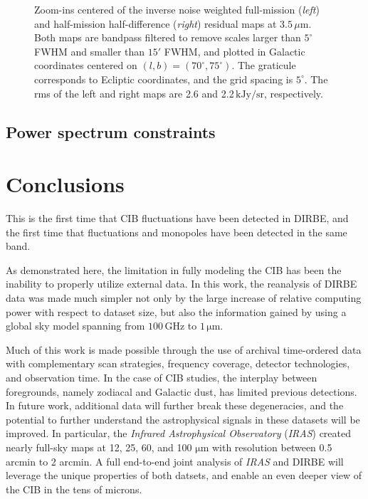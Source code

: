 \documentclass{aa}
\begin{document}
\begin{figure}
  \caption{Zoom-ins centered of the inverse noise weighted full-mission (\emph{left}) and half-mission half-difference (\emph{right}) residual maps at $3.5\,\mu\mathrm{m}$. Both maps are bandpass filtered to remove scales larger than $5^{\circ}$ FWHM and smaller than $15'$ FWHM, and plotted in Galactic coordinates centered on $(l,b)=(70^{\circ},75^{\circ})$. The graticule corresponds to Ecliptic coordinates, and the grid spacing is $5^{\circ}$. The rms of the left and right maps are 2.6 and 2.2\,$\mathrm{kJy}/\mathrm{sr}$, respectively. }
  \label{fig:hmhs_zoom_fluct}
\end{figure}

\subsection{Power spectrum constraints}


\section{Conclusions}
\label{sec:conclusions}

This is the first time that CIB fluctuations have been detected in DIRBE, and the first time that fluctuations and monopoles have been detected in the same band.

As demonstrated here, the limitation in fully modeling the CIB has been the inability to properly utilize external data. In this work, the reanalysis of DIRBE data was made much simpler not only by the large increase of relative computing power with respect to dataset size, but also the information gained by using a global sky model spanning from $100\,\mathrm{GHz}$ to $1\,\mathrm{\mu m}$.

Much of this work is made possible through the use of archival time-ordered data with complementary scan strategies, frequency coverage, detector technologies, and observation time. In the case of CIB studies, the interplay between foregrounds, namely zodiacal and Galactic dust, has limited previous detections. In future work, additional data will further break these degeneracies, and the potential to further understand the astrophysical signals in these datasets will be improved. In particular, the \textit{Infrared Astrophysical Observatory} (\textit{IRAS}) created nearly full-sky maps at 12, 25, 60, and 100 $\mathrm{\mu m}$ with resolution between 0.5 arcmin to 2 arcmin. A full end-to-end joint analysis of \textit{IRAS} and DIRBE will leverage the unique properties of both datsets, and enable an even deeper view of the CIB in the tens of microns.
\end{document}
